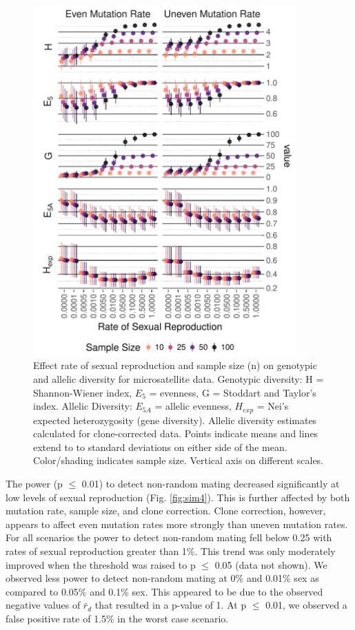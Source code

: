 \documentclass[]{article}
\theoremstyle{definition}
\theoremstyle{definition}
\theoremstyle{definition}
\theoremstyle{remark}
\begin{document}
\begin{figure}
\centering
\includegraphics[width=0.90000\textwidth]{figure/diversity_stats.pdf}
\caption{Effect rate of sexual reproduction and sample size (n) on
genotypic and allelic diversity for microsatellite data. Genotypic
diversity: H = Shannon-Wiener index, \(E_5\) = evenness, G = Stoddart
and Taylor's index. Allelic Diversity: \(E_{5A}\) = allelic evenness,
\(H_{exp}\) = Nei's expected heterozygosity (gene diversity). Allelic
diversity estimates calculated for clone-corrected data. Points indicate
means and lines extend to to standard deviations on either side of the
mean. Color/shading indicates sample size. Vertical axis on different
scales.}\label{fig:simdiv}
\end{figure}

The power (p \(\leq\) 0.01) to detect non-random mating decreased
significantly at low levels of sexual reproduction (Fig.
\ref{fig:sim4}). This is further affected by both mutation rate, sample
size, and clone correction. Clone correction, however, appears to affect
even mutation rates more strongly than uneven mutation rates. For all
scenarios the power to detect non-random mating fell below 0.25 with
rates of sexual reproduction greater than 1\%. This trend was only
moderately improved when the threshold was raised to p \(\leq\) 0.05
(data not shown). We observed less power to detect non-random mating at
0\% and 0.01\% sex as compared to 0.05\% and 0.1\% sex. This appeared to
be due to the observed negative values of \(\bar{r}_d\) that resulted in
a p-value of 1. At p \(\leq\) 0.01, we observed a false positive rate of
1.5\% in the worst case scenario.
\end{document}
